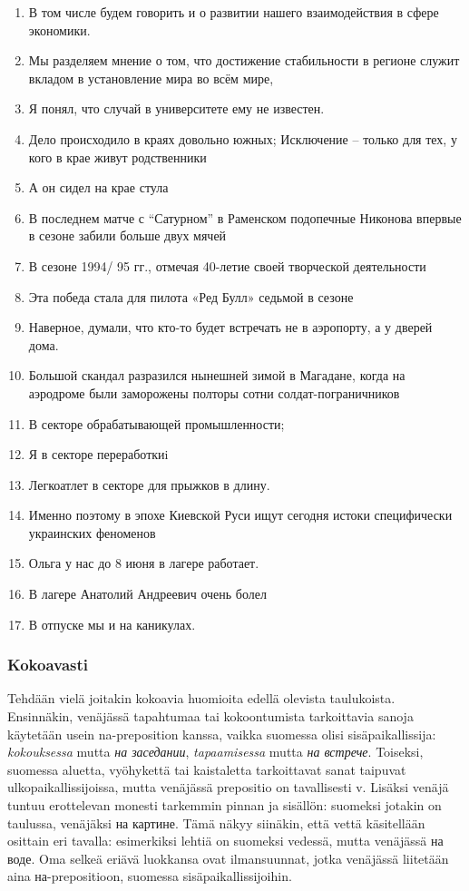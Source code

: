 \documentclass[]{scrartcl}
\providecommand{\tightlist}{%
  \setlength{\itemsep}{0pt}\setlength{\parskip}{0pt}}
\begin{document}
\begin{enumerate}
\def\labelenumi{(\arabic{enumi})}
\setcounter{enumi}{198}
\tightlist
\item
  В том числе будем говорить и о развитии нашего взаимодействия в сфере
  экономики.
\item
  Мы разделяем мнение о том, что достижение стабильности в регионе
  служит вкладом в установление мира во всём мире,
\item
  Я понял, что случай в университете ему не известен.
\item
  Дело происходило в краях довольно южных; Исключение -- только для тех,
  у кого в крае живут родственники
\item
  А он сидел на крае стула
\item
  В последнем матче с ``Сатурном'' в Раменском подопечные Никонова
  впервые в сезоне забили больше двух мячей
\item
  В сезоне 1994/ 95 гг., отмечая 40-летие своей творческой деятельности
\item
  Эта победа стала для пилота «Ред Булл» седьмой в сезоне
\item
  Наверное, думали, что кто-то будет встречать не в аэропорту, а у
  дверей дома.
\item
  Большой скандал разразился нынешней зимой в Магадане, когда на
  аэродроме были заморожены полторы сотни солдат-пограничников
\item
  В секторе обрабатывающей промышленности;
\item
  Я в секторе переработкиi
\item
  Легкоатлет в секторе для прыжков в длину.
\item
  Именно поэтому в эпохе Киевской Руси ищут сегодня истоки специфически
  украинских феноменов
\item
  Ольга у нас до 8 июня в лагере работает.
\item
  В лагере Анатолий Андреевич очень болел
\item
  В отпуске мы и на каникулах.
\end{enumerate}

\subsubsection{Kokoavasti}\label{kokoavasti}

Tehdään vielä joitakin kokoavia huomioita edellä olevista taulukoista.
Ensinnäkin, venäjässä tapahtumaa tai kokoontumista tarkoittavia sanoja
käytetään usein na-preposition kanssa, vaikka suomessa olisi
sisäpaikallissija: \emph{kokouksessa} mutta \emph{на заседании},
\emph{tapaamisessa} mutta \emph{на встрече}. Toiseksi, suomessa aluetta,
vyöhykettä tai kaistaletta tarkoittavat sanat taipuvat
ulkopaikallissijoissa, mutta venäjässä prepositio on tavallisesti v.
Lisäksi venäjä tuntuu erottelevan monesti tarkemmin pinnan ja sisällön:
suomeksi jotakin on taulussa, venäjäksi на картине. Tämä näkyy siinäkin,
että vettä käsitellään osittain eri tavalla: esimerkiksi lehtiä on
suomeksi vedessä, mutta venäjässä на воде. Oma selkeä eriävä luokkansa
ovat ilmansuunnat, jotka venäjässä liitetään aina на-prepositioon,
suomessa sisäpaikallissijoihin.
\end{document}
